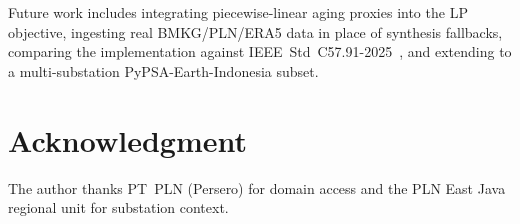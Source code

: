 \documentclass[conference]{IEEEtran}
\begin{document}
Future work includes integrating piecewise-linear aging proxies into the LP objective, ingesting real BMKG/PLN/ERA5 data in place of synthesis fallbacks, comparing the implementation against IEEE~Std~C57.91-2025~\cite{ieee_c5791_2025}, and extending to a multi-substation PyPSA-Earth-Indonesia subset.

\section*{Acknowledgment}
The author thanks PT~PLN (Persero) for domain access and the PLN East Java regional unit for substation context.



\end{document}
